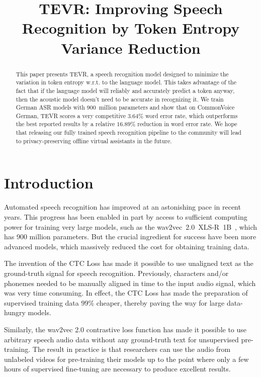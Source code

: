 \title{TEVR: Improving Speech Recognition by Token Entropy Variance Reduction}



\maketitle

\begin{abstract}
This paper presents TEVR, a speech recognition model
designed to minimize the variation in token entropy w.r.t. to the language model.
This takes advantage of the fact that 
if the language model will reliably and accurately predict a token anyway,
then the acoustic model doesn't need to be accurate in recognizing it.
We train German ASR models with 900~million parameters and show that on CommonVoice German,
TEVR scores a very competitive $3.64\%$ word error rate,
which outperforms the best reported results
by a relative $16.89\%$ reduction in word error rate.
We hope that releasing our fully trained speech recognition pipeline to the community 
will lead to privacy-preserving offline virtual assistants
in the future.

\end{abstract}

\section{Introduction}
\label{section-intro}

Automated speech recognition has improved at an astonishing pace in recent years. This progress has been enabled in part by access to sufficient computing power for training very large models, such as the wav2vec~2.0~XLS-R~1B~\citep{wav2vec2_2020, xlsr_2020, xlsr_1B_2021}, which has 900 million parameters. But the crucial ingredient for success have been more advanced models, which massively reduced the cost for obtaining training data. 

The invention of the CTC Loss \citep{ctc_loss} has made it possible to use unaligned text as the ground-truth signal for speech recognition. Previously, characters and/or phonemes needed to be manually aligned in time to the input audio signal, which was very time consuming. In effect, the CTC Loss has made the preparation of supervised training data $99\%$ cheaper, thereby paving the way for large data-hungry models.

Similarly, the wav2vec 2.0 contrastive loss function has made it possible to use arbitrary speech audio data without any ground-truth text for unsupervised pre-training. The result in practice is that researchers can use the audio from unlabeled videos for pre-training their models up to the point where only a few hours of supervised fine-tuning are necessary to produce excellent results.

